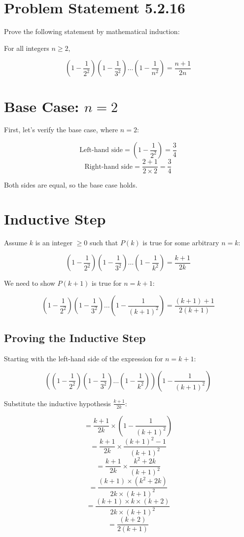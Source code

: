 \documentclass[12pt]{article}
\begin{document}
\section*{Problem Statement 5.2.16}

Prove the following statement by mathematical induction:

For all integers \( n \geq 2 \),

\[
(1-\frac{1}{2^2})(1-\frac{1}{3^2}) \ldots (1-\frac{1}{n^2}) = \frac{n+1}{2n}
\]

\newpage
  \section{Base Case: \( n = 2 \)}

First, let's verify the base case, where \( n = 2 \):

\[
\text{Left-hand side} = (1-\frac{1}{2^2}) = \frac{3}{4}
\]
\[
\text{Right-hand side} = \frac{2+1}{2 \times 2} = \frac{3}{4}
\]

Both sides are equal, so the base case holds.

\section{Inductive Step}

Assume \( k \) is an integer \(  \geq 0 \) such that  \( P(k) \) is true for some arbitrary \( n = k \):

\[
(1-\frac{1}{2^2})(1-\frac{1}{3^2}) \ldots (1-\frac{1}{k^2}) = \frac{k+1}{2k}
\]

We need to show \( P(k+1) \) is true for \( n = k+1 \):

\[
(1-\frac{1}{2^2})(1-\frac{1}{3^2}) \ldots (1-\frac{1}{(k+1)^2}) = \frac{(k+1)+1}{2(k+1)}
\]

\subsection{Proving the Inductive Step}

Starting with the left-hand side of the expression for \( n = k+1 \):

\[
\left( (1-\frac{1}{2^2})(1-\frac{1}{3^2}) \ldots (1-\frac{1}{k^2}) \right) (1-\frac{1}{(k+1)^2})
\]

Substitute the inductive hypothesis \( \frac{k+1}{2k} \):

\[
= \frac{k+1}{2k} \times (1 - \frac{1}{(k+1)^2})
\]
\[
= \frac{k+1}{2k} \times \frac{(k+1)^2 - 1}{(k+1)^2}
\]
\[
= \frac{k+1}{2k} \times \frac{k^2 + 2k}{(k+1)^2}
\]
\[
= \frac{(k+1) \times (k^2 + 2k)}{2k \times (k+1)^2}
\]
\[
= \frac{(k+1) \times k \times (k+2)}{2k \times (k+1)^2}
\]
\[
= \frac{(k+2)}{2(k+1)}
\]
\end{document}
